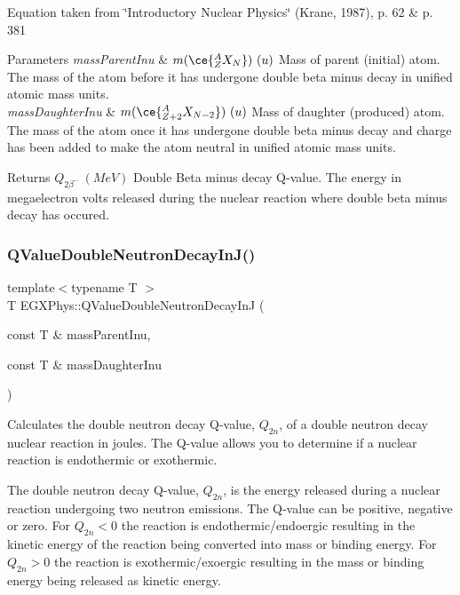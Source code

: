 Equation taken from \char`\"{}\+Introductory Nuclear Physics\char`\"{} (Krane, 1987), p. 62 \& p. 381


\begin{DoxyParams}{Parameters}
{\em mass\+Parent\+Inu} & $m(\ce{ ^{A}_{Z}X_{N} })\ (u)$ Mass of parent (initial) atom. The mass of the atom before it has undergone double beta minus decay in unified atomic mass units. \\
\hline
{\em mass\+Daughter\+Inu} & $m(\ce{ ^{A}_{Z{+2}}X_{N-2} })\ (u)$ Mass of daughter (produced) atom. The mass of the atom once it has undergone double beta minus decay and charge has been added to make the atom neutral in unified atomic mass units. \\
\hline
\end{DoxyParams}
\begin{DoxyReturn}{Returns}
$Q_{2\beta^-}\ (MeV)$ Double Beta minus decay Q-\/value. The energy in megaelectron volts released during the nuclear reaction where double beta minus decay has occured. 
\end{DoxyReturn}
\mbox{\label{group___q_value_gada1ace2aa0a791df382f120767a56fe9}} 
\subsubsection{\texorpdfstring{Q\+Value\+Double\+Neutron\+Decay\+In\+J()}{QValueDoubleNeutronDecayInJ()}}
{\footnotesize\ttfamily template$<$typename T $>$ \\
T E\+G\+X\+Phys\+::\+Q\+Value\+Double\+Neutron\+Decay\+InJ (\begin{DoxyParamCaption}\item[{const T \&}]{mass\+Parent\+Inu,  }\item[{const T \&}]{mass\+Daughter\+Inu }\end{DoxyParamCaption})}



Calculates the double neutron decay Q-\/value, $Q_{2n}$, of a double neutron decay nuclear reaction in joules. The Q-\/value allows you to determine if a nuclear reaction is endothermic or exothermic. 

The double neutron decay Q-\/value, $Q_{2n}$, is the energy released during a nuclear reaction undergoing two neutron emissions. The Q-\/value can be positive, negative or zero. For $Q_{2n} < 0$ the reaction is endothermic/endoergic resulting in the kinetic energy of the reaction being converted into mass or binding energy. For $Q_{2n} > 0$ the reaction is exothermic/exoergic resulting in the mass or binding energy being released as kinetic energy.

